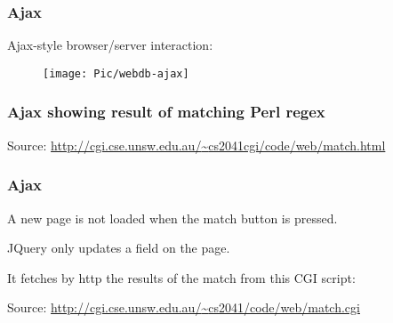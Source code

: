 \begin{frame}
\frametitle{Ajax}
Ajax-style browser/server interaction:

    \begin{figure}
        \centering
        \texttt{[image: Pic/webdb-ajax]}
    \end{figure}
\end{frame}

\begin{frame}[fragile]
\frametitle{Ajax showing result of matching Perl regex}

{\tiny Source:  \href{http://cgi.cse.unsw.edu.au/~cs2041cgi/code/web/match.html}{http://cgi.cse.unsw.edu.au/{\textasciitilde}cs2041cgi/code/web/match.html}}
\end{frame}

\begin{frame}[fragile]
\frametitle{Ajax}

A new page is not loaded when the match button is pressed.

JQuery only updates a field on the page.

It fetches by http the results of the match from this CGI script:


{\tiny Source:  \href{http://cgi.cse.unsw.edu.au/~cs2041/code/web/match.cgi}{http://cgi.cse.unsw.edu.au/{\textasciitilde}cs2041/code/web/match.cgi}}

\end{frame}

